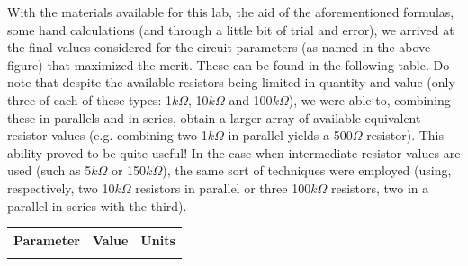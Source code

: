 With the materials available for this lab, the aid of the aforementioned formulas, some hand calculations (and through a little bit of trial and error), we arrived at the final values considered for the circuit parameters (as named in the above figure) that maximized the merit. These can be found in the following table. Do note that despite the available resistors being limited in quantity and value (only three of each of these types: 1$k\Omega$, 10$k\Omega$ and 100$k\Omega$), we were able to, combining these in parallels and in series, obtain a larger array of available equivalent resistor values (e.g. combining two 1$k\Omega$ in parallel yields a 500$\Omega$ resistor). This ability proved to be quite useful! In the case when intermediate resistor values are used (such as 5$k\Omega$ or 150$k\Omega$), the same sort of techniques were employed (using, respectively, two 10$k\Omega$ resistors in parallel or three 100$k\Omega$ resistors, two in a parallel in series with the third).

\hfill
 \parbox{1\linewidth}{
  \centering
  \begin{tabular}{|l|l|r|}
    \hline    
    {\bf Parameter} & {\bf Value} & {\bf Units }\\ \hline
    
  \label{tab:params}
  \end{tabular}
  }
\par

